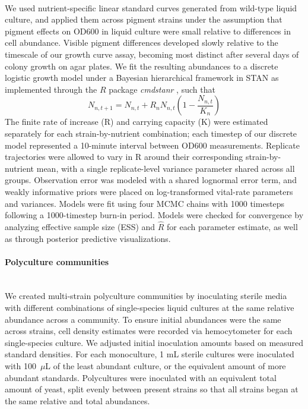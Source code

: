 \paragraph*{}
We used nutrient-specific linear standard curves generated from wild-type liquid culture, and applied them across pigment strains under the assumption that pigment effects on OD600 in liquid culture were small relative to differences in cell abundance. Visible pigment differences developed slowly relative to the timescale of our growth curve assay, becoming most distinct after several days of colony growth on agar plates. We fit the resulting abundances to a discrete logistic growth model under a Bayesian hierarchical framework in STAN \parencite{carpenter2017stan} as implemented through the $R$ package \textit{cmdstanr} \parencite{gabry2021cmdstanr}, such that 
\begin{equation}
    N_{n,t+1}=N_{n,t}+R_nN_{n,t}\left(1-\frac{N_{n,t}}{K_n}\right) \label{eq:logistic}
\end{equation}
The finite rate of increase (R) and carrying capacity (K) were estimated separately for each strain-by-nutrient combination; each timestep of our discrete model represented a 10-minute interval between OD600 measurements. Replicate trajectories were allowed to vary in R around their corresponding strain-by-nutrient mean, with a single replicate-level variance parameter shared across all groups. Observation error was modeled with a shared lognormal error term, and weakly informative priors were placed on log-transformed vital-rate parameters and variances. Models were fit using four MCMC chains with 1000 timesteps following a 1000-timestep burn-in period. Models were checked for convergence by analyzing effective sample size (ESS) and $\hat{R}$ for each parameter estimate, as well as through posterior predictive visualizations. 


\paragraph*{Polyculture communities}\mbox{}\\
We created multi-strain polyculture communities by inoculating sterile media with different combinations of single-species liquid cultures at the same relative abundance across a community. To ensure initial abundances were the same across strains, cell density estimates were recorded via hemocytometer for each single-species culture. We adjusted initial inoculation amounts based on measured standard densities. For each monoculture, 1 mL sterile cultures were inoculated with 100~$\mu$L of the least abundant culture, or the equivalent amount of more abundant standards. Polycultures were inoculated with an equivalent total amount of yeast, split evenly between present strains so that all strains began at the same relative and total abundances. 

